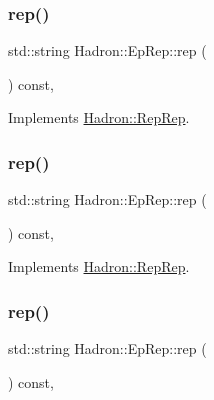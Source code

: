 \subsubsection{\texorpdfstring{rep()}{rep()}\hspace{0.1cm}{\footnotesize\ttfamily [1/3]}}
{\footnotesize\ttfamily std\+::string Hadron\+::\+Ep\+Rep\+::rep (\begin{DoxyParamCaption}{ }\end{DoxyParamCaption}) const\hspace{0.3cm}{\ttfamily [inline]}, {\ttfamily [virtual]}}



Implements \mbox{\hyperlink{structHadron_1_1RepRep_ab3213025f6de249f7095892109575fde}{Hadron\+::\+Rep\+Rep}}.

\mbox{\label{structHadron_1_1EpRep_aa5a9f64d0578ca4e2ba9abce86d06bd6}} 
\subsubsection{\texorpdfstring{rep()}{rep()}\hspace{0.1cm}{\footnotesize\ttfamily [2/3]}}
{\footnotesize\ttfamily std\+::string Hadron\+::\+Ep\+Rep\+::rep (\begin{DoxyParamCaption}{ }\end{DoxyParamCaption}) const\hspace{0.3cm}{\ttfamily [inline]}, {\ttfamily [virtual]}}



Implements \mbox{\hyperlink{structHadron_1_1RepRep_ab3213025f6de249f7095892109575fde}{Hadron\+::\+Rep\+Rep}}.

\mbox{\label{structHadron_1_1EpRep_aa5a9f64d0578ca4e2ba9abce86d06bd6}} 
\subsubsection{\texorpdfstring{rep()}{rep()}\hspace{0.1cm}{\footnotesize\ttfamily [3/3]}}
{\footnotesize\ttfamily std\+::string Hadron\+::\+Ep\+Rep\+::rep (\begin{DoxyParamCaption}{ }\end{DoxyParamCaption}) const\hspace{0.3cm}{\ttfamily [inline]}, {\ttfamily [virtual]}}



